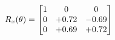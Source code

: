 \documentclass[preview]{standalone}
\begin{document}
\begin{align*}
\special{dvisvgm:raw <g id='unique000'>}R_{x}(\theta) = \begin{bmatrix}1 & 0 & 0 \\0 & +0.72 & -0.69 \\0 & +0.69 & +0.72\end{bmatrix}\special{dvisvgm:raw </g>}
\end{align*}
\end{document}
